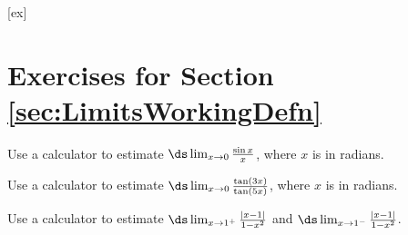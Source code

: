 [ex]
\section*{Exercises for Section \ref{sec:LimitsWorkingDefn}}

\begin{enumialphparenastyle}

\begin{ex}
Use a calculator to estimate $\ds\lim_{x\to 0}
\frac{\sin x}{x}$, where $x$ is in radians.
\end{ex}

\begin{ex}
Use a calculator to estimate $\ds\lim_{x\to 0}
\frac{\tan(3x)}{\tan(5x)}$, where $x$ is in radians.
\end{ex}

\begin{ex}
Use a calculator to estimate $\ds\lim_{x\to 1^{+}}\frac{|x-1|}{1-x^2}$ and $\ds\lim_{x\to 1^{-}}\frac{|x-1|}{1-x^2}$.
\end{ex}

\end{enumialphparenastyle}